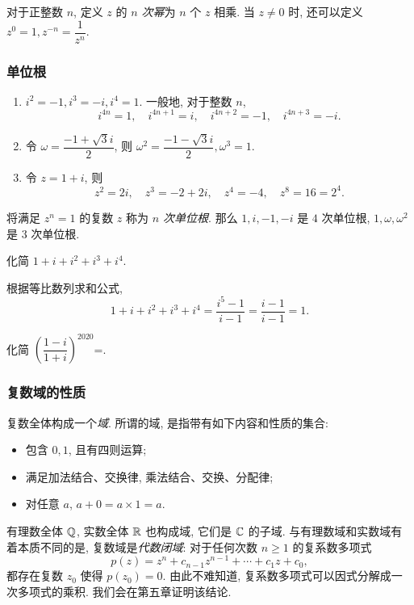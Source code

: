 对于正整数 $n$, 定义 $z$ 的 \emph{$n$ 次幂}为 $n$ 个 $z$ 相乘.
当 $z\neq 0$ 时, 还可以定义 $z^0=1,z^{-n}=\dfrac1{z^n}$.

\subsubsection*{单位根}
\begin{example}
  \begin{enumerate}
    \item $i^2=-1,i^3=-i,i^4=1$.
    一般地, 对于整数 $n$, 
    \[i^{4n}=1,\quad i^{4n+1}=i,\quad i^{4n+2}=-1,\quad i^{4n+3}=-i.\]
    \item 令 $\omega=\dfrac{-1+\sqrt 3i}2$, 则 $\omega^2=\dfrac{-1-\sqrt3i}2,\omega^3=1$.
    \item 令 $z=1+i$, {则
    \[z^2=2i,\quad z^3=-2+2i,\quad z^4=-4,\quad z^8=16=2^4.\]}
  \end{enumerate}
  将满足 $z^n=1$ 的复数 $z$ 称为 \emph{$n$ 次单位根}.
  那么 $1,i,-1,-i$ 是 $4$ 次单位根, $1,\omega,\omega^2$ 是 $3$ 次单位根.
\end{example}

\begin{example}
  化简 $1+i+i^2+i^3+i^4$.
\end{example}
\begin{solution}
  根据等比数列求和公式,
  \[1+i+i^2+i^3+i^4=\frac{i^5-1}{i-1}
  {=\frac{i-1}{i-1}=1.}\]
\end{solution}

\begin{exercise}
  化简 $\left(\dfrac{1-i}{1+i}\right)^{2020}$=\fillblank{}.
\end{exercise}

\subsubsection*{复数域的性质}

复数全体构成一个\emph{域}.
所谓的域, 是指带有如下内容和性质的集合:
\begin{itemize}
  \item 包含 $0,1$, 且有四则运算;
  \item 满足加法结合、交换律, 乘法结合、交换、分配律;
  \item 对任意 $a$, $a+0=a\times 1=a$.
\end{itemize}
有理数全体 ${\mathbb{Q}}$, 实数全体 ${\mathbb{R}}$ 也构成域, 它们是 ${\mathbb{C}}$ 的子域.
与有理数域和实数域有着本质不同的是, 复数域是\emph{代数闭域}:
对于任何次数 $n\ge 1$ 的复系数多项式
  \[p(z)=z^n+c_{n-1}z^{n-1}+\cdots+c_1z+c_0,\]
都存在复数 $z_0$ 使得 $p(z_0)=0$.
由此不难知道, 复系数多项式可以因式分解成一次多项式的乘积.
我们会在第五章证明该结论.

